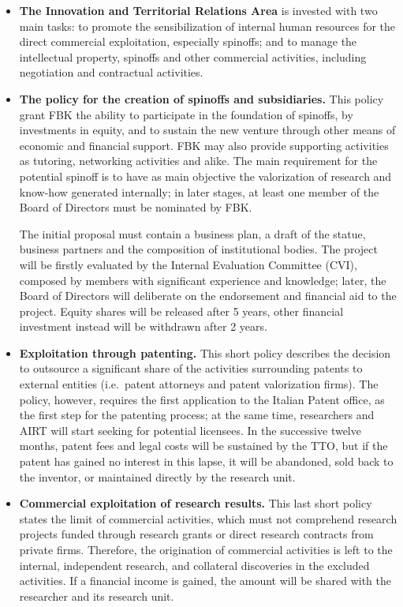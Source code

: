 \begin{itemize}

\item \textbf{The Innovation and Territorial Relations Area} is invested with two main tasks: to promote the sensibilization of internal human resources for the direct commercial exploitation, especially spinoffs; and to manage the intellectual property, spinoffs and other commercial activities, including negotiation and contractual activities. 

\item \textbf{The policy for the creation of spinoffs and subsidiaries.} This policy grant FBK the ability to participate in the foundation of spinoffs, by investments in equity, and to sustain the new venture through other means of economic and financial support. FBK may also provide supporting activities as tutoring, networking activities and alike. The main requirement for the potential spinoff is to have as main objective the valorization of research and know-how generated internally; in later stages, at least one member of the Board of Directors must be nominated by FBK.

The initial proposal must contain a business plan, a draft of the statue, business partners and the composition of institutional bodies. The project will be firstly evaluated by the Internal Evaluation Committee (CVI), composed by members with significant experience and knowledge; later, the Board of Directors will deliberate on the endorsement and financial aid to the project. Equity shares will be released after 5 years, other financial investment instead will be withdrawn after 2 years.

\item \textbf{Exploitation through patenting.} This short policy describes the decision to outsource a significant share of the activities surrounding patents to external entities (i.e.\ patent attorneys and patent valorization firms). The policy, however, requires the first application to the Italian Patent office, as the first step for the patenting process; at the same time, researchers and AIRT will start seeking for potential licensees. In the successive twelve months, patent fees and legal costs will be sustained by the TTO, but if the patent has gained no interest in this lapse, it will be abandoned, sold back to the inventor, or maintained directly by the research unit. 

\item \textbf{Commercial exploitation of research results.} This last short policy states the limit of commercial activities, which must not comprehend research projects funded through research grants or direct research contracts from private firms. Therefore, the origination of commercial activities is left to the internal, independent research, and collateral discoveries in the excluded activities. If a financial income is gained, the amount will be shared with the researcher and its research unit.

\end{itemize}

